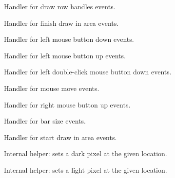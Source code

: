 
Handler for draw row handles events.


\label{cbpanedrawpluginonfinishdrawinarea}


Handler for finish draw in area events.


\label{cbpanedrawpluginonlbuttondown}


Handler for left mouse button down events.


\label{cbpanedrawpluginonlbuttonup}


Handler for left mouse button up events.


\label{cbpanedrawpluginonldblclick}


Handler for left double-click mouse button down events.


\label{cbpanedrawpluginonmousemove}


Handler for mouse move events.


\label{cbpanedrawpluginonrbuttonup}


Handler for right mouse button up events.


\label{cbpanedrawpluginonsizebarwindow}


Handler for bar size events.


\label{cbpanedrawpluginonstartdrawinarea}


Handler for start draw in area events.


\label{cbpanedrawpluginsetdarkpixel}


Internal helper: sets a dark pixel at the given location.


\label{cbpanedrawpluginsetlightpixel}


Internal helper: sets a light pixel at the given location.

